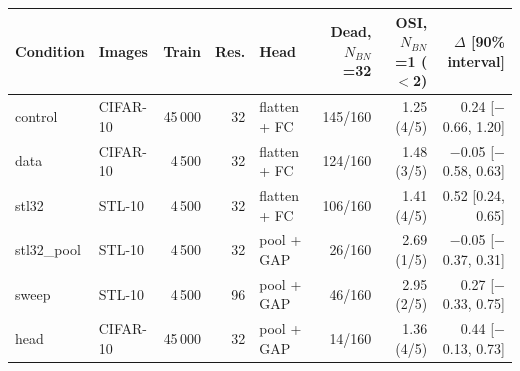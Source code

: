 \begin{tabular}{llrrlrrr}
\toprule
Condition & Images & Train & Res. & Head & Dead, $N_{BN}$=32 & OSI, $N_{BN}$=1 ($<$2) & $\Delta$ [90\% interval] \\
\midrule
control & CIFAR-10 & 45\,000 & 32 & flatten + FC & 145/160 & 1.25 (4/5) & 0.24 [$-$0.66, 1.20] \\
data & CIFAR-10 & 4\,500 & 32 & flatten + FC & 124/160 & 1.48 (3/5) & $-$0.05 [$-$0.58, 0.63] \\
stl32 & STL-10 & 4\,500 & 32 & flatten + FC & 106/160 & 1.41 (4/5) & 0.52 [0.24, 0.65] \\
stl32\_pool & STL-10 & 4\,500 & 32 & pool + GAP & 26/160 & 2.69 (1/5) & $-$0.05 [$-$0.37, 0.31] \\
sweep & STL-10 & 4\,500 & 96 & pool + GAP & 46/160 & 2.95 (2/5) & 0.27 [$-$0.33, 0.75] \\
head & CIFAR-10 & 45\,000 & 32 & pool + GAP & 14/160 & 1.36 (4/5) & 0.44 [$-$0.13, 0.73] \\
\bottomrule
\end{tabular}
